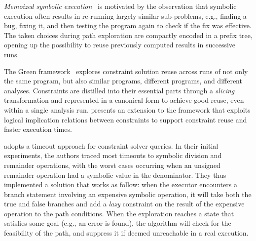 {\em Memoized symbolic execution}~\cite{MEMO-ISSTA12} is motivated by the observation that symbolic execution often results in re-running largely similar sub-problems, e.g., finding a bug, fixing it, and then testing the program again to check if the fix was effective. The taken choices during path exploration are compactly encoded in a prefix tree, opening up the possibility to reuse previously computed results in successive runs.

The Green framework~\cite{GREEN-FSE12} explores constraint solution reuse across runs of not only the same program, but also similar programs, different programs, and different analyses. Constraints are distilled into their essential parts through a {\em slicing} transformation and represented in a canonical form to achieve good reuse, even within a single analysis run. \cite{JGY-ISSTA15} presents an extension to the framework that exploits logical implication relations between constraints to support constraint reuse and faster execution times.



\cite{UCKLEE-USEC15} adopts a timeout approach for constraint solver queries. In their initial experiments, the authors traced most timeouts to symbolic division and remainder operations, with the worst cases occurring when an unsigned remainder operation had a symbolic value in the denominator.
They thus implemented a solution that works as follow: when the executor encounters a branch statement involving an expensive symbolic operation, it will take both the true and false branches and add a {\em lazy} constraint on the result of the expensive operation to the path conditions. When the exploration reaches a state that satisfies some goal (e.g., an error is found), the algorithm will check for the feasibility of the path, and suppress it if deemed unreachable in a real execution.

